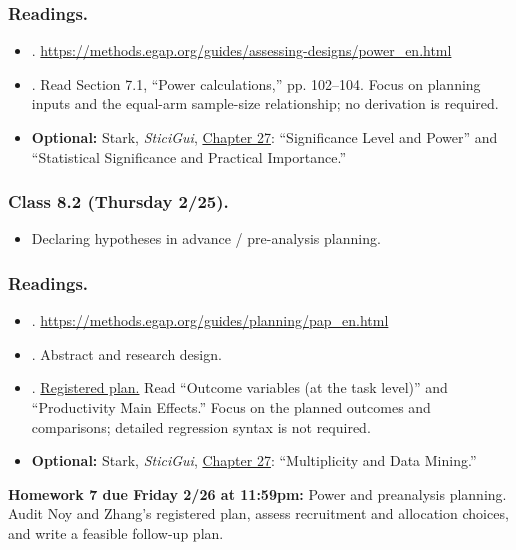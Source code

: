 \documentclass[letterpaper, 12pt, parskip=full,DIV=10]{scrartcl}
\begin{document}
\subsubsection*{Readings.}
\begin{itemize}
\item {}. \url{https://methods.egap.org/guides/assessing-designs/power_en.html}
\item {}. Read Section 7.1, ``Power calculations,'' pp. 102--104. Focus on planning inputs and the equal-arm sample-size relationship; no derivation is required.
\item \textbf{Optional:} Stark, \textit{SticiGui}, \href{https://www.stat.berkeley.edu/~stark/SticiGui/Text/testing.htm}{Chapter 27}: ``Significance Level and Power'' and ``Statistical Significance and Practical Importance.''
\end{itemize}

\subsubsection*{Class 8.2 (Thursday 2/25).}
\begin{itemize}
\item Declaring hypotheses in advance / pre-analysis planning.
\end{itemize}

\subsubsection*{Readings.}
\begin{itemize}
\item {}. \url{https://methods.egap.org/guides/planning/pap_en.html}
\item {}. Abstract and research design.
\item {}. \href{https://www.socialscienceregistry.org/versions/170369/docs/version/document}{Registered plan.} Read ``Outcome variables (at the task level)'' and ``Productivity Main Effects.'' Focus on the planned outcomes and comparisons; detailed regression syntax is not required.
\item \textbf{Optional:} Stark, \textit{SticiGui}, \href{https://www.stat.berkeley.edu/~stark/SticiGui/Text/testing.htm}{Chapter 27}: ``Multiplicity and Data Mining.''
\end{itemize}

\textbf{Homework 7 due Friday 2/26 at 11:59pm:}
Power and preanalysis planning. Audit Noy and Zhang's registered plan, assess recruitment and allocation choices, and write a feasible follow-up plan.
\end{document}
